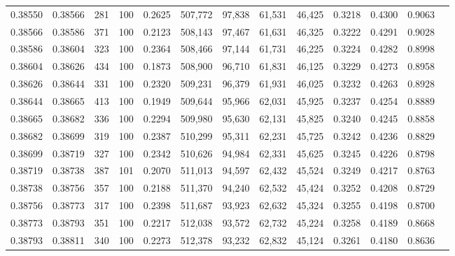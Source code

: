 \begin{tabular}{rrrrrrrrrrrrr}
0.38550 & 0.38566 &   281 & 100 &                                     0.2625 & 507,772 &  97,838 &  61,531 &  46,425 & 0.3218 & 0.4300 & 0.9063 \\
0.38566 & 0.38586 &   371 & 100 &                                     0.2123 & 508,143 &  97,467 &  61,631 &  46,325 & 0.3222 & 0.4291 & 0.9028 \\
0.38586 & 0.38604 &   323 & 100 &                                     0.2364 & 508,466 &  97,144 &  61,731 &  46,225 & 0.3224 & 0.4282 & 0.8998 \\
0.38604 & 0.38626 &   434 & 100 &                                     0.1873 & 508,900 &  96,710 &  61,831 &  46,125 & 0.3229 & 0.4273 & 0.8958 \\
0.38626 & 0.38644 &   331 & 100 &                                     0.2320 & 509,231 &  96,379 &  61,931 &  46,025 & 0.3232 & 0.4263 & 0.8928 \\
0.38644 & 0.38665 &   413 & 100 &                                     0.1949 & 509,644 &  95,966 &  62,031 &  45,925 & 0.3237 & 0.4254 & 0.8889 \\
0.38665 & 0.38682 &   336 & 100 &                                     0.2294 & 509,980 &  95,630 &  62,131 &  45,825 & 0.3240 & 0.4245 & 0.8858 \\
0.38682 & 0.38699 &   319 & 100 &                                     0.2387 & 510,299 &  95,311 &  62,231 &  45,725 & 0.3242 & 0.4236 & 0.8829 \\
0.38699 & 0.38719 &   327 & 100 &                                     0.2342 & 510,626 &  94,984 &  62,331 &  45,625 & 0.3245 & 0.4226 & 0.8798 \\
0.38719 & 0.38738 &   387 & 101 &                                     0.2070 & 511,013 &  94,597 &  62,432 &  45,524 & 0.3249 & 0.4217 & 0.8763 \\
0.38738 & 0.38756 &   357 & 100 &                                     0.2188 & 511,370 &  94,240 &  62,532 &  45,424 & 0.3252 & 0.4208 & 0.8729 \\
0.38756 & 0.38773 &   317 & 100 &                                     0.2398 & 511,687 &  93,923 &  62,632 &  45,324 & 0.3255 & 0.4198 & 0.8700 \\
0.38773 & 0.38793 &   351 & 100 &                                     0.2217 & 512,038 &  93,572 &  62,732 &  45,224 & 0.3258 & 0.4189 & 0.8668 \\
0.38793 & 0.38811 &   340 & 100 &                                     0.2273 & 512,378 &  93,232 &  62,832 &  45,124 & 0.3261 & 0.4180 & 0.8636 \\

\end{tabular}
